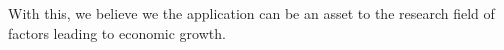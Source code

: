 With this, we believe we the application can be an asset to the research field of factors leading to economic growth.



